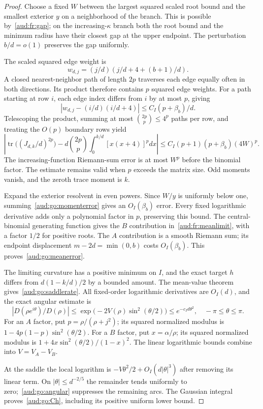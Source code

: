 \documentclass[11pt,a4paper]{article}
\numberwithin{equation}{section}
\begin{document}
\begin{proof}
Choose a fixed $W$ between the largest squared scaled root bound and the smallest exterior $y$ on a neighborhood of the branch. This is possible by~\eqref{aud:fr:gap}; on the increasing-$\kappa$ branch both the root bound and the minimum radius have their closest gap at the upper endpoint. The perturbation $b/d=o(1)$ preserves the gap uniformly.

The scaled squared edge weight is
\[
 w_{d,j}=(j/d)(j/d+4+(b+1)/d).
\]
A closed nearest-neighbor path of length $2p$ traverses each edge equally often in both directions. Its product therefore contains $p$ squared edge weights. For a path starting at row $i$, each edge index differs from $i$ by at most $p$, giving
\[
 |w_{d,j}-(i/d)(i/d+4)|\le C_I(p+\beta_b)/d.
\]
Telescoping the product, summing at most $\binom{2p}{p}\le4^p$ paths per row, and treating the $O(p)$ boundary rows yield
\begin{equation}\label{aud:go:momenterror}
 \left|\operatorname{tr}\bigl((J_{d,k}/d)^{2p}\bigr)
 -d\binom{2p}{p}\int_0^{k/d}[x(x+4)]^pdx\right|
 \le C_I(p+1)(p+\beta_b)(4W)^p.
\end{equation}
The increasing-function Riemann-sum error is at most $W^p$ before the binomial factor. The estimate remains valid when $p$ exceeds the matrix size. Odd moments vanish, and the zeroth trace moment is $k$.

Expand the exterior resolvent in even powers. Since $W/y$ is uniformly below one, summing~\eqref{aud:go:momenterror} gives an $O_I(\beta_b)$ error. Every fixed logarithmic derivative adds only a polynomial factor in $p$, preserving this bound. The central-binomial generating function gives the $B$ contribution in~\eqref{aud:fr:meanlimit}, with a factor $1/2$ for positive roots. The $A$ contribution is a smooth Riemann sum; its endpoint displacement $m-2d=\min(0,b)$ costs $O_I(\beta_b)$. This proves~\eqref{aud:go:meanerror}.

The limiting curvature has a positive minimum on $I$, and the exact target $h$ differs from $d(1-k/d)/2$ by a bounded amount. The mean-value theorem gives~\eqref{aud:go:saddlerate}. All fixed-order logarithmic derivatives are $O_I(d)$, and the exact angular estimate is
\begin{equation}\label{aud:go:angular}
 \left|D(\rho e^{i\theta})/D(\rho)\right|
 \le\exp\bigl(-2V(\rho)\sin^2(\theta/2)\bigr)
 \le e^{-c_I d\theta^2},\quad -\pi\le\theta\le\pi.
\end{equation}
For an $A$ factor, put $p=\rho/(\rho+j^2)$; its squared normalized modulus is $1-4p(1-p)\sin^2(\theta/2)$. For a $B$ factor, put $x=\alpha/\rho$; its squared normalized modulus is $1+4x\sin^2(\theta/2)/(1-x)^2$. The linear logarithmic bounds combine into $V=V_A-V_B$.

At the saddle the local logarithm is $-V\theta^2/2+O_I(d|\theta|^3)$ after removing its linear term. On $|\theta|\le d^{-2/5}$ the remainder tends uniformly to zero;~\eqref{aud:go:angular} suppresses the remaining arcs. The Gaussian integral proves~\eqref{aud:go:Ch}, including its positive uniform lower bound.
\end{proof}
\end{document}
